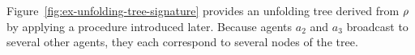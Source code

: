 \begin{example}
Figure~\ref{fig:ex-unfolding-tree-signature} provides an unfolding tree derived from $\rho$ by applying a procedure introduced later. Because agents $a_2$ and $a_3$ broadcast to several other agents, they each correspond to several nodes of the tree.  


\end{example}
